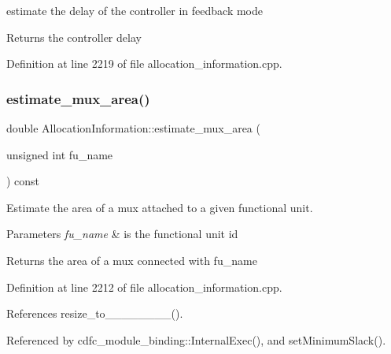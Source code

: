 estimate the delay of the controller in feedback mode 

\begin{DoxyReturn}{Returns}
the controller delay 
\end{DoxyReturn}


Definition at line 2219 of file allocation\+\_\+information.\+cpp.

\mbox{\label{classAllocationInformation_a2b709f9c79ac9504bd36620dd385ce50}} 
\subsubsection{\texorpdfstring{estimate\+\_\+mux\+\_\+area()}{estimate\_mux\_area()}}
{\footnotesize\ttfamily double Allocation\+Information\+::estimate\+\_\+mux\+\_\+area (\begin{DoxyParamCaption}\item[{unsigned int}]{fu\+\_\+name }\end{DoxyParamCaption}) const}



Estimate the area of a mux attached to a given functional unit. 


\begin{DoxyParams}{Parameters}
{\em fu\+\_\+name} & is the functional unit id \\
\hline
\end{DoxyParams}
\begin{DoxyReturn}{Returns}
the area of a mux connected with fu\+\_\+name 
\end{DoxyReturn}


Definition at line 2212 of file allocation\+\_\+information.\+cpp.



References resize\+\_\+to\+\_\+\_\+\_\+\_\+\_\+\_\+\_\+\_().



Referenced by cdfc\+\_\+module\+\_\+binding\+::\+Internal\+Exec(), and set\+Minimum\+Slack().

